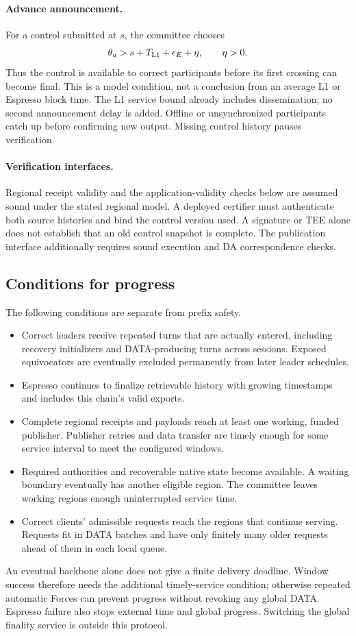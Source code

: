 \documentclass[11pt,a4paper]{article}
\newcounter{protocol}
\begin{document}
\paragraph{Advance announcement.}
For a control submitted at $s$, the committee chooses
\[
 \theta_a>s+T_{\rm L1}+\epsilon_E+\eta,
 \qquad \eta>0.
\]
Thus the control is available to correct participants before its
first crossing can become final. This is a model condition, not a
conclusion from an average L1 or Espresso block time. The L1 service
bound already includes dissemination; no second announcement delay is
added. Offline or unsynchronized participants catch up before confirming
new output. Missing control history pauses verification.

\paragraph{Verification interfaces.}
Regional receipt validity and the application-validity checks below
are assumed sound under the stated regional model. A deployed
certifier must authenticate both source histories and bind the control
version used. A signature or TEE alone does not establish that an old
control snapshot is complete. The publication interface additionally
requires sound execution and DA correspondence checks.

\subsection{Conditions for progress}
\label{sec:progress}
The following conditions are separate from prefix safety.
\begin{itemize}
\item Correct leaders receive repeated turns that are actually entered,
including recovery initializers and DATA-producing turns across
sessions. Exposed equivocators are eventually excluded permanently
from later leader schedules.
\item Espresso continues to finalize retrievable history with growing
timestamps and includes this chain's valid exports.
\item Complete regional receipts and payloads reach at least one
working, funded publisher. Publisher retries and data transfer are
timely enough for some service interval to meet the configured windows.
\item Required authorities and recoverable native state become
available. A waiting boundary eventually has another eligible region.
The committee leaves working regions enough uninterrupted service time.
\item Correct clients' admissible requests reach the regions that
continue serving. Requests fit in DATA batches and have only finitely
many older requests ahead of them in each local queue.
\end{itemize}
An eventual backbone alone does not give a finite delivery deadline.
Window success therefore needs the additional timely-service condition;
otherwise repeated automatic Forces can prevent progress without
revoking any global DATA. Espresso failure also stops external time and
global progress. Switching the global finality service is outside this
protocol.
\end{document}
